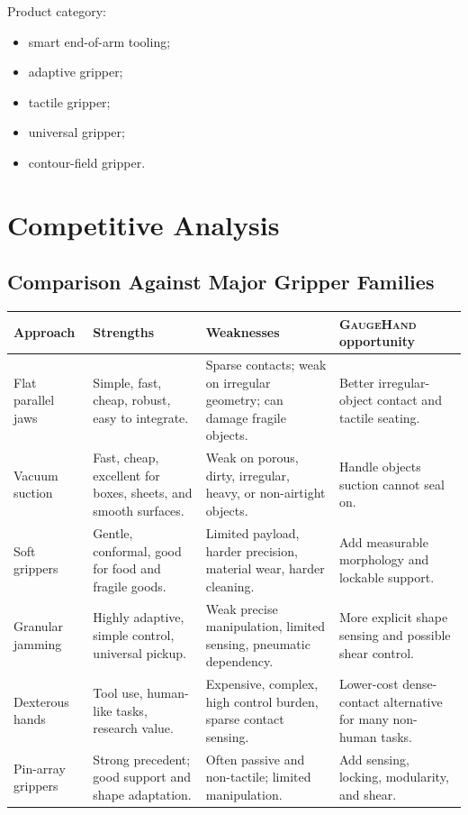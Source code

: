 \documentclass[11pt]{article}
\newcommand{\GaugeHand}{\textsc{GaugeHand}}
\begin{document}
Product category:

\begin{itemize}[leftmargin=*]
  \item smart end-of-arm tooling;
  \item adaptive gripper;
  \item tactile gripper;
  \item universal gripper;
  \item contour-field gripper.
\end{itemize}

\section{Competitive Analysis}

\subsection{Comparison Against Major Gripper Families}

\begin{longtable}{L{0.18\textwidth} L{0.27\textwidth} L{0.27\textwidth} L{0.18\textwidth}}
\toprule
\textbf{Approach} & \textbf{Strengths} & \textbf{Weaknesses} & \textbf{\GaugeHand{} opportunity} \\
\midrule
\endhead
Flat parallel jaws & Simple, fast, cheap, robust, easy to integrate. & Sparse contacts; weak on irregular geometry; can damage fragile objects. & Better irregular-object contact and tactile seating. \\
Vacuum suction & Fast, cheap, excellent for boxes, sheets, and smooth surfaces. & Weak on porous, dirty, irregular, heavy, or non-airtight objects. & Handle objects suction cannot seal on. \\
Soft grippers & Gentle, conformal, good for food and fragile goods. & Limited payload, harder precision, material wear, harder cleaning. & Add measurable morphology and lockable support. \\
Granular jamming & Highly adaptive, simple control, universal pickup. & Weak precise manipulation, limited sensing, pneumatic dependency. & More explicit shape sensing and possible shear control. \\
Dexterous hands & Tool use, human-like tasks, research value. & Expensive, complex, high control burden, sparse contact sensing. & Lower-cost dense-contact alternative for many non-human tasks. \\
Pin-array grippers & Strong precedent; good support and shape adaptation. & Often passive and non-tactile; limited manipulation. & Add sensing, locking, modularity, and shear. \\
\bottomrule
\end{longtable}
\end{document}
